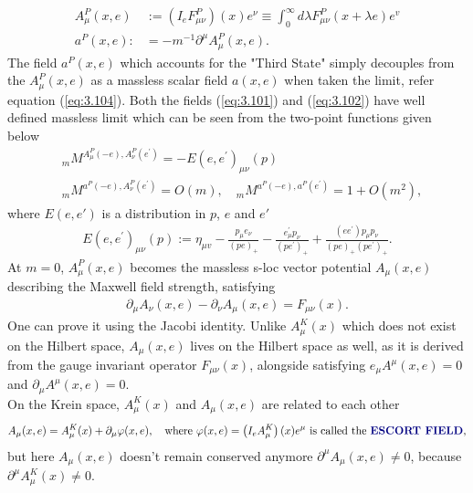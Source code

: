 \documentclass[12pt,a4paper]{article}
\numberwithin{equation}{section}
\begin{document}
\begin{align}\label{eq:3.101}
A^P_{\mu}(x, e) &:=\left(I_{e} F^P_{\mu \nu}\right)(x) e^{\nu} \equiv \int_{0}^{\infty} d \lambda F^P_{\mu \nu}(x+\lambda e) e^{v} \\
a^P(x, e): &=-m^{-1} \partial^{\mu} A^P_{\mu}(x, e)\label{eq:3.102}.
\end{align}
The field $a^P(x,e)$ which accounts for the "Third State" simply decouples from the $A^P_\mu(x,e)$ as a massless scalar field $a(x,e)$ when taken the limit, refer equation (\ref{eq:3.104}). Both the fields (\ref{eq:3.101}) and (\ref{eq:3.102}) have well defined massless limit which can be seen from the two-point functions given below 
\begin{align}\label{eq:3.104}
&{ }_{m} M^{A^P_{\mu}(-e), A^P_{\nu}\left(e^{\prime}\right)}=-E\left(e, e^{\prime}\right)_{\mu \nu}(p)\\ &{}_m M^{a^P(-e), A^P_{\nu}\left(e^{\prime}\right)}=O(m), \quad{ }_{m} M^{a^P(-e), a^P\left(e^{\prime}\right)}=1+O\left(m^{2}\right),
\end{align}
where $E(e,e')$ is a distribution in $p$, $e$ and $e'$
\begin{align}
E\left(e, e^{\prime}\right)_{\mu \nu}(p):=\eta_{\mu v}-\frac{p_{\mu} e_{\nu}}{(p e)_{+}}-\frac{e_{\mu}^{\prime} p_{\nu}}{\left(p e^{\prime}\right)_{+}}+\frac{\left(e e^{\prime}\right) p_{\mu} p_{\nu}}{(p e)_{+}\left(p e^{\prime}\right)_{+}}.
\end{align}
At $m=0$, $A^P_\mu(x,e)$ becomes the massless s-loc vector potential $A_\mu(x,e)$ describing the Maxwell field strength, satisfying 
\begin{align}
\partial_\mu A_\nu(x,e)-\partial_\nu A_\mu(x,e)=F_{\mu\nu}(x).
\end{align}
One can prove it using the Jacobi identity.
Unlike $A^K_\mu(x)$ which does not exist on the Hilbert space, $A_\mu(x,e)$ lives on the Hilbert space as well, as it is derived from the gauge invariant operator $F_{\mu\nu}(x)$, alongside satisfying $e_\mu A^\mu(x,e)=0 $ and $\partial_\mu A^\mu(x,e)=0$.\\
On the Krein space, $A^K_\mu(x)$ and $A_\mu(x,e)$ are related to each other 
\begin{align}
A_\mu(x,e)=A^K_\mu(x)+\partial_\mu\varphi(x,e),\quad\text{where $\varphi(x,e)=\left(I_eA^K_\mu\right)(x)e^\mu$ is called the \textbf{\textcolor{blue!50!black}{ESCORT FIELD}},}
\end{align} 
but here $A_\mu(x,e)$ doesn't remain conserved anymore $\partial^\mu A_\mu(x,e)\neq0$, because $\partial^\mu A^K_{\mu}(x)\neq0$. \\\\
\end{document}

